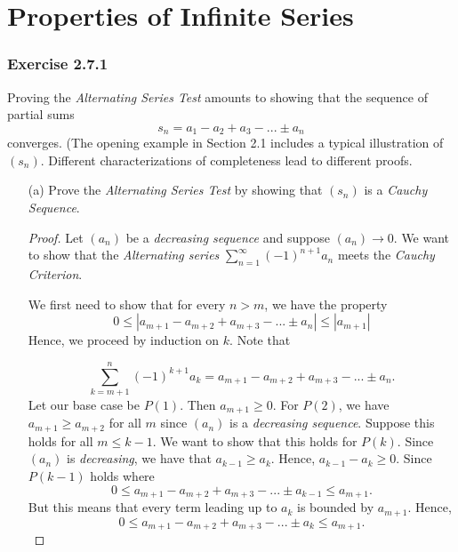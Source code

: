 \section{Properties of Infinite Series}

\subsubsection{Exercise 2.7.1} Proving the \textit{Alternating Series Test} amounts to showing that the sequence of partial sums 
\[ s_n = a_1 - a_2 + a_3 - ... \pm a_n\] converges. (The opening example in Section 2.1 includes a typical illustration of \((s_n)\). Different characterizations of completeness lead to different proofs. 
\begin{enumerate}
    \item[(a)] Prove the \textit{Alternating Series Test} by showing that \( (s_n)\) is a \textit{Cauchy Sequence}. 
        \begin{proof}
            Let \( (a_n)\) be a \textit{decreasing sequence} and suppose \( (a_n) \to 0 \). We want to show that the \textit{Alternating series} \( \sum_{n=1}^{\infty} (-1)^{n+1} a_n\) meets the \textit{Cauchy Criterion}. 

            We first need to show that for every \( n > m\), we have the property
            \[ 0 \leq |a_{m+1} - a_{m+2} + a_{m+3} - ... \pm a_n| \leq |a_{m+1}|\]
            Hence, we proceed by induction on \( k\). Note that 

            \[ \sum_{k=m+1}^{n} (-1)^{k+1}a_k = a_{m+1} - a_{m+2} + a_{m+3} - ... \pm a_n .\]
            Let our base case be \( P(1)\). Then \( a_{m+1} \geq 0\). For \( P(2)\), we have \( a_{m+1} \geq a_{m+2}\) for all \( m \) since \( (a_n)\) is a \textit{decreasing sequence}. Suppose this holds for all \( m \leq k-1   \). We want to show that this holds for \( P(k)\). Since \((a_n)\) is \textit{decreasing}, we have that \( a_{k-1} \geq a_{k}\). Hence, \( a_{k-1} - a_{k} \geq 0 \). Since \( P(k-1)\) holds where 
            \[ 0 \leq a_{m+1} - a_{m+2} + a_{m+3} - ... \pm a_{k-1} \leq a_{m+1}.\]
            But this means that every term leading up to \( a_k \) is bounded by \( a_{m+1}\). Hence, 
            \[ 0 \leq a_{m+1} - a_{m+2} + a_{m+3} - ... \pm a_k \leq a_{m+1}.\]
        

\end{proof}
\end{enumerate}
